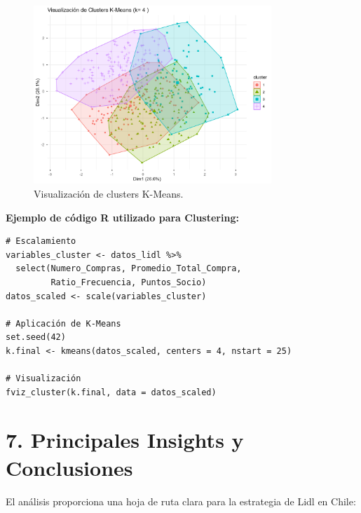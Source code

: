 \documentclass[12pt,a4paper]{article}
\begin{document}
\begin{figure}[H]
    \centering
    \includegraphics[width=0.8\textwidth]{grafico_clusters.png}
    \caption{Visualización de clusters K-Means.}
    \label{fig:clusters}
\end{figure}

\vspace{0.5cm}

\textbf{Ejemplo de código R utilizado para Clustering:}
\begin{verbatim}
# Escalamiento
variables_cluster <- datos_lidl %>%
  select(Numero_Compras, Promedio_Total_Compra, 
         Ratio_Frecuencia, Puntos_Socio)
datos_scaled <- scale(variables_cluster)

# Aplicación de K-Means
set.seed(42) 
k.final <- kmeans(datos_scaled, centers = 4, nstart = 25)

# Visualización
fviz_cluster(k.final, data = datos_scaled)
\end{verbatim}

\section*{7. Principales Insights y Conclusiones}
El análisis proporciona una hoja de ruta clara para la estrategia de Lidl en Chile:
\end{document}
